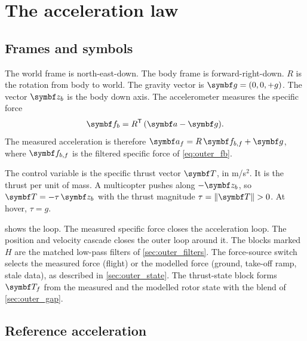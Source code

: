 \section{The acceleration law}\label{sec:outer_law}

\subsection{Frames and symbols}

The world frame is north-east-down.
The body frame is forward-right-down.
$R$ is the rotation from body to world.
The gravity vector is $\vect g = (0,0,+g)$.
The vector $\vect z_b$ is the body down axis.
The accelerometer measures the specific force
\begin{equation}\label{eq:outer_fb}
  \vect f_b = R^{\mathsf T}\,(\vect a - \vect g) .
\end{equation}
The measured acceleration is therefore $\vect a_f = R\,\vect f_{b,f} + \vect g$, where $\vect f_{b,f}$ is the filtered specific force of \cref{eq:outer_fb}.

The control variable is the specific thrust vector $\vect T$, in m/s$^2$.
It is the thrust per unit of mass.
A multicopter pushes along $-\vect z_b$, so $\vect T = -\tau\,\vect z_b$ with the thrust magnitude $\tau = \lVert\vect T\rVert > 0$.
At hover, $\tau = g$.


 shows the loop.
The measured specific force closes the acceleration loop.
The position and velocity cascade closes the outer loop around it.
The blocks marked $H$ are the matched low-pass filters of \cref{sec:outer_filters}.
The force-source switch selects the measured force (flight) or the modelled force (ground, take-off ramp, stale data), as described in \cref{sec:outer_state}.
The thrust-state block forms $\vect T_f$ from the measured and the modelled rotor state with the blend of \cref{sec:outer_gap}.

\subsection{Reference acceleration}\label{sec:outer_cascade}

